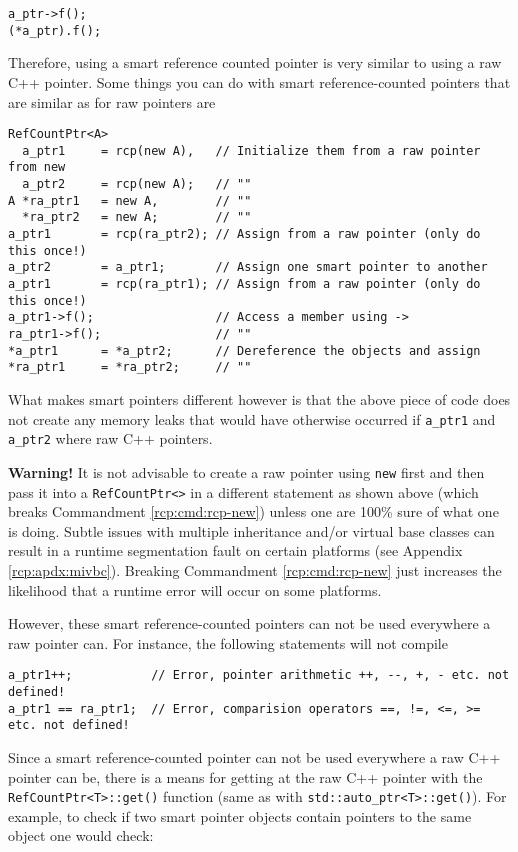 {\scriptsize\begin{verbatim}
a_ptr->f();
(*a_ptr).f();
\end{verbatim}}

Therefore, using a smart reference counted pointer is very similar to
using a raw C++ pointer.  Some things you can do with smart
reference-counted pointers that are similar as for raw pointers are

{\scriptsize\begin{verbatim}
RefCountPtr<A>
  a_ptr1     = rcp(new A),   // Initialize them from a raw pointer from new
  a_ptr2     = rcp(new A);   // ""
A *ra_ptr1   = new A,        // ""
  *ra_ptr2   = new A;        // ""
a_ptr1       = rcp(ra_ptr2); // Assign from a raw pointer (only do this once!)
a_ptr2       = a_ptr1;       // Assign one smart pointer to another
a_ptr1       = rcp(ra_ptr1); // Assign from a raw pointer (only do this once!)
a_ptr1->f();                 // Access a member using ->
ra_ptr1->f();                // ""
*a_ptr1      = *a_ptr2;      // Dereference the objects and assign
*ra_ptr1     = *ra_ptr2;     // "" 
\end{verbatim}}

What makes smart pointers different however is that the above piece of code
does not create any memory leaks that would have otherwise occurred
if \texttt{a\_ptr1} and \texttt{a\_ptr2} where raw C++ pointers.

\textbf{Warning!} It is not advisable to create a raw pointer using
\texttt{new} first and then pass it into a \texttt{RefCountPtr<>} in a
different statement as shown above (which breaks Commandment
\ref{rcp:cmd:rcp-new}) unless one are 100\% sure of what one is doing.
Subtle issues with multiple inheritance and/or virtual base classes
can result in a runtime segmentation fault on certain platforms (see
Appendix \ref{rcp:apdx:mivbc}).  Breaking Commandment
\ref{rcp:cmd:rcp-new} just increases the likelihood that a runtime
error will occur on some platforms.

However, these smart reference-counted pointers can not be used
everywhere a raw pointer can.  For instance, the following
statements will not compile

{\scriptsize\begin{verbatim}
a_ptr1++;           // Error, pointer arithmetic ++, --, +, - etc. not defined!
a_ptr1 == ra_ptr1;  // Error, comparision operators ==, !=, <=, >= etc. not defined!
\end{verbatim}}

Since a smart reference-counted pointer can not be used everywhere a
raw C++ pointer can be, there is a means for getting at the raw C++
pointer with the \texttt{RefCountPtr<T>::get()} function (same as with
\texttt{std::auto\_ptr<T>::get()}).  For example, to check if two
smart pointer objects contain pointers to the same object one would
check:

